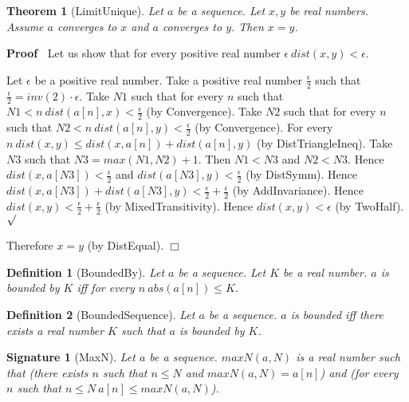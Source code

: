 \documentclass{article}
\newenvironment{forthel}{\begin{leftbar}}{\end{leftbar}}
\newenvironment{proof}{\noindent\textbf{Proof\ }}{\hspace*{\fill}$\Box$\medskip}
\newenvironment{subproof}{\begin{list}{}{}
		\item[\text{Proof}]}{\hfill $\surd$ \end{list}}
\newtheorem{theorem}{Theorem}
\newtheorem{definition}{Definition}
\newtheorem{signature}{Signature}
\newcommand{\halfeps}{\frac{\epsilon}{2}}
\begin{document}
\begin{forthel}
	\begin{theorem}[LimitUnique]
	Let $a$ be a sequence. Let $x, y$ be real numbers. Assume $a$ converges to $x$ and $a$ converges to $y$.
	Then $x = y$.
	\end{theorem}
	\begin{proof}
	Let us show that for every positive real number $\epsilon \ dist(x,y) < \epsilon$.
	\begin{subproof}
	Let $\epsilon$ be a positive real number.
	Take a positive real number $\halfeps$ such that $\halfeps = inv(2) \cdot \epsilon$.
	Take $N1$ such that for every $n$ such that $N1 < n \ dist(a[n],x) < \halfeps$ (by Convergence).
	Take $N2$ such that for every $n$ such that $N2 < n \ dist(a[n],y) < \halfeps$ (by Convergence).
	For every $n \ dist(x,y) \leq dist(x,a[n]) + dist(a[n],y)$ (by DistTriangleIneq). 
	Take $N3$ such that $N3 = max(N1,N2) + 1$.
	Then $N1 < N3$ and $N2 < N3$.
	Hence $dist(x,a[N3]) < \halfeps$ and $dist(a[N3],y) < \halfeps$ (by DistSymm).
	Hence $dist(x,a[N3]) + dist(a[N3],y) < \halfeps + \halfeps$ (by AddInvariance).
	Hence $dist(x,y) < \halfeps + \halfeps$ (by MixedTransitivity).
	Hence $dist(x,y) < \epsilon$ (by TwoHalf).
	\end{subproof}
	Therefore $x = y$ (by DistEqual).
	\end{proof}
	
	\begin{definition}[BoundedBy]
	Let $a$ be a sequence. Let $K$ be a real number. $a$ is bounded by $K$ iff
	for every $n \ abs(a[n]) \leq K$.
	\end{definition}
	
	\begin{definition}[BoundedSequence]
	Let $a$ be a sequence. $a$ is bounded iff there exists a real number $K$ such that
	$a$ is bounded by $K$.
	\end{definition}
	
	\begin{signature}[MaxN]
	Let $a$ be a sequence. $maxN(a,N)$ is a real number such that
	(there exists $n$ such that $n \leq N$ and $maxN(a,N) = a[n]$) and
	(for every $n$ such that $n \leq N \ a[n] \leq maxN(a,N)$).
	\end{signature}
	

\end{forthel}
\end{document}
